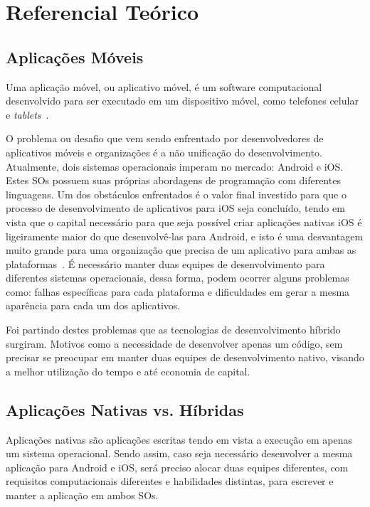 

\chapter{Referencial Teórico}\label{ch:referencial_teorico}

\section{Aplicações Móveis}\label{sec:aplicacoes-moveis}
Uma aplicação móvel, ou aplicativo móvel, é um software computacional desenvolvido para ser executado em um dispositivo móvel, como telefones celular e \textit{tablets}~\cite{clow2019flutter}.


O problema ou desafio que vem sendo enfrentado por desenvolvedores de aplicativos móveis e organizações é a não unificação do desenvolvimento.
Atualmente, dois sistemas operacionais imperam no mercado: Android e iOS. Estes SOs possuem suas próprias abordagens de programação com diferentes linguagens.
Um dos obstáculos enfrentados é o valor final investido para que o processo de desenvolvimento de aplicativos para iOS seja concluído, tendo em vista que o capital necessário para que seja possível criar aplicações nativas iOS é ligeiramente maior do que desenvolvê-las para Android, e isto é uma desvantagem muito grande para uma organização que precisa de um aplicativo para ambas as plataformas~\cite{goadrich2011smart}.
É necessário manter duas equipes de desenvolvimento para diferentes sistemas operacionais, dessa forma, podem ocorrer alguns problemas como: falhas específicas para cada plataforma e dificuldades em gerar a mesma aparência para cada um dos aplicativos\cite{clow2019flutter}.


Foi partindo destes problemas que as tecnologias de desenvolvimento híbrido surgiram.
Motivos como a necessidade de desenvolver apenas um código, sem precisar se preocupar em manter duas equipes de desenvolvimento nativo, visando a melhor utilização do tempo e até economia de capital\cite{yatsenko2019comparative}{}.

\section{Aplicações Nativas vs. Híbridas}\label{sec:aplicacoes-nativas-vs.-hibridas}
Aplicações nativas são aplicações escritas tendo em vista a execução em apenas um sistema operacional\cite{clow2019flutter}.
Sendo assim, caso seja necessário desenvolver a mesma aplicação para Android e iOS, será preciso alocar duas equipes diferentes, com requisitos computacionais diferentes e habilidades distintas, para escrever e manter a aplicação em ambos SOs.

